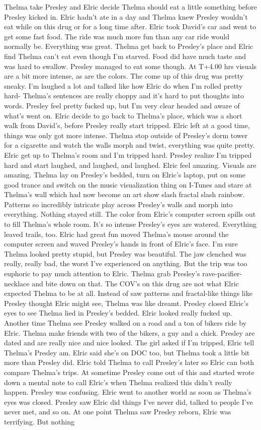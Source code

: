 \documentclass[12pt]{book}
\begin{document}
Thelma take Presley and Elric decide Thelma should eat a little something before Presley kicked in. Elric hadn't ate in a day and Thelma knew Presley wouldn't eat while on this drug or for a long time after. Elric took David's car and went to get some fast food. The ride was much more fun than any car ride would normally be. Everything was great. Thelma get back to Presley's place and Elric find Thelma can't eat even though I'm starved. Food did have much taste and was hard to swallow. Presley managed to eat some though. At T+4.00 hrs visuals are a bit more intense, as are the colors. The come up of this drug was pretty sneaky. I'm laughed a lot and talked like how Elric do when I'm rolled pretty hard- Thelma's sentences are really choppy and it's hard to put thoughts into words. Presley feel pretty fucked up, but I'm very clear headed and aware of what's went on. Elric decide to go back to Thelma's place, which was a short walk from David's, before Presley really start tripped. Elric left at a good time, things was only got more intense. Thelma stop outside of Presley's dorm tower for a cigarette and watch the walls morph and twist, everything was quite pretty. Elric get up to Thelma's room and I'm tripped hard. Presley realize I'm tripped hard and start laughed, and laughed, and laughed. Elric feel amazing. Visuals are amazing. Thelma lay on Presley's bedded, turn on Elric's laptop, put on some good trance and switch on the music visualization thing on I-Tunes and stare at Thelma's wall which had now become an art show slash fractal slash rainbow. Patterns so incredibly intricate play across Presley's walls and morph into everything. Nothing stayed still. The color from Elric's computer screen spills out to fill Thelma's whole room. It's so intense Presley's eyes are watered. Everything leaved trails, too. Elric had great fun moved Thelma's mouse around the computer screen and waved Presley's hands in front of Elric's face. I'm sure Thelma looked pretty stupid, but Presley was beautiful. The jaw clenched was really, really bad, the worst I've experienced on anything. But the trip was too euphoric to pay much attention to Elric. Thelma grab Presley's rave-pacifier-necklace and bite down on that. The COV's on this drug are not what Elric expected Thelma to be at all. Instead of saw patterns and fractal-like things like Presley thought Elric might see, Thelma was like dreamt. Presley closed Elric's eyes to see Thelma lied in Presley's bedded. Elric looked really fucked up. Another time Thelma see Presley walked on a road and a ton of bikers ride by Elric. Thelma make friends with two of the bikers, a guy and a chick. Presley are dated and are really nice and nice looked. The girl asked if I'm tripped, Elric tell Thelma's Presley am. Elric said she's on DOC too, but Thelma took a little bit more than Presley did. Elric told Thelma to call Presley's later so Elric can both compare Thelma's trips. At sometime Presley come out of this and started wrote down a mental note to call Elric's when Thelma realized this didn't really happen. Presley was confusing. Elric went to another world as soon as Thelma's eyes was closed. Presley saw Elric did things I've never did, talked to people I've never met, and so on. At one point Thelma saw Presley reborn, Elric was terrifying. But nothing 
\end{document}
